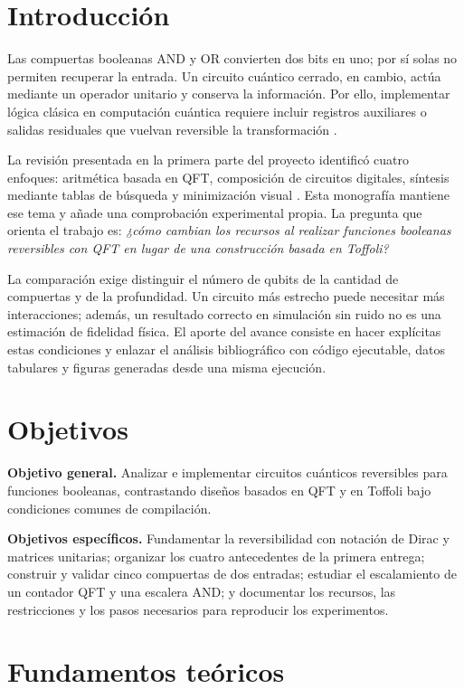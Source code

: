 \section{Introducción}
Las compuertas booleanas AND y OR convierten dos bits en uno; por sí solas no
permiten recuperar la entrada. Un circuito cuántico cerrado, en cambio, actúa
mediante un operador unitario y conserva la información. Por ello, implementar
lógica clásica en computación cuántica requiere incluir registros auxiliares o
salidas residuales que vuelvan reversible la transformación \cite{nielsen2010}.

La revisión presentada en la primera parte del proyecto identificó cuatro
enfoques: aritmética basada en QFT, composición de circuitos digitales,
síntesis mediante tablas de búsqueda y minimización visual
\cite{kaltehei2026,escanez2026,clarino2025,hajjdiab2024}.
Esta monografía mantiene ese tema y añade una comprobación experimental propia.
La pregunta que orienta el trabajo es: \emph{¿cómo cambian los recursos al
realizar funciones booleanas reversibles con QFT en lugar de una construcción
basada en Toffoli?}

La comparación exige distinguir el número de qubits de la cantidad de
compuertas y de la profundidad. Un circuito más estrecho puede necesitar más
interacciones; además, un resultado correcto en simulación sin ruido no es una
estimación de fidelidad física. El aporte del avance consiste en hacer explícitas
estas condiciones y enlazar el análisis bibliográfico con código ejecutable,
datos tabulares y figuras generadas desde una misma ejecución.

\section{Objetivos}
\textbf{Objetivo general.} Analizar e implementar circuitos cuánticos reversibles
para funciones booleanas, contrastando diseños basados en QFT y en Toffoli bajo
condiciones comunes de compilación.

\textbf{Objetivos específicos.} Fundamentar la reversibilidad con notación de
Dirac y matrices unitarias; organizar los cuatro antecedentes de la primera
entrega; construir y validar cinco compuertas de dos entradas; estudiar el
escalamiento de un contador QFT y una escalera AND; y documentar los recursos,
las restricciones y los pasos necesarios para reproducir los experimentos.

\section{Fundamentos teóricos}
